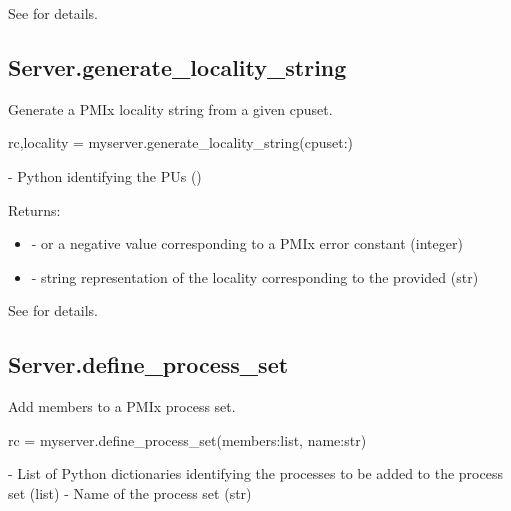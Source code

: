 See  for details.


\subsection{Server.generate_locality_string}

\summary
Generate a \ac{PMIx} locality string from a given cpuset.

\format

\pyspecificstart
\begin{codepar}
rc,locality = myserver.generate_locality_string(cpuset:)
\end{codepar}
\pyspecificend


\begin{arglist}
 - Python  identifying the \acp{PU} ()
\end{arglist}

Returns:

\begin{itemize}
    \item {} -  or a negative value corresponding to a PMIx error constant (integer)
    \item {} - string representation of the locality corresponding to the provided  (str)
\end{itemize}

See  for details.


\subsection{Server.define_process_set}

\summary
Add members to a \ac{PMIx} process set.

\format

\pyspecificstart
\begin{codepar}
rc = myserver.define_process_set(members:list, name:str)
\end{codepar}
\pyspecificend


\begin{arglist}
 - List of Python  dictionaries identifying the processes to be added to the process set (list)
 - Name of the process set (str)
\end{arglist}

